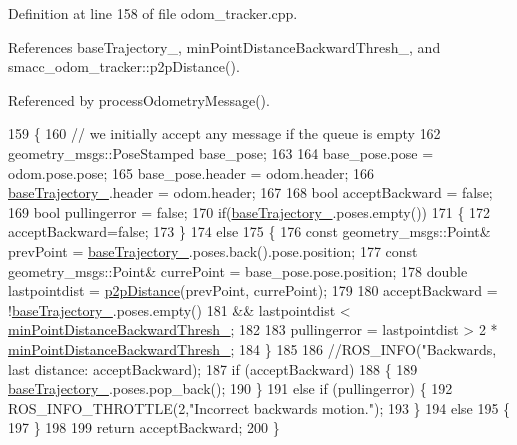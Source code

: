 Definition at line 158 of file odom\+\_\+tracker.\+cpp.



References base\+Trajectory\+\_\+, min\+Point\+Distance\+Backward\+Thresh\+\_\+, and smacc\+\_\+odom\+\_\+tracker\+::p2p\+Distance().



Referenced by process\+Odometry\+Message().


\begin{DoxyCode}
159 \{
160     \textcolor{comment}{// we initially accept any message if the queue is empty   }
162 \textcolor{comment}{}    geometry\_msgs::PoseStamped base\_pose;
163     
164     base\_pose.pose = odom.pose.pose;
165     base\_pose.header = odom.header;
166     \hyperlink{classsmacc__odom__tracker_1_1OdomTracker_ac3a17be46ab833632c5f63e75c840dc7}{baseTrajectory\_}.header = odom.header;
167 
168     \textcolor{keywordtype}{bool} acceptBackward = \textcolor{keyword}{false};
169     \textcolor{keywordtype}{bool} pullingerror = \textcolor{keyword}{false};
170     \textcolor{keywordflow}{if}(\hyperlink{classsmacc__odom__tracker_1_1OdomTracker_ac3a17be46ab833632c5f63e75c840dc7}{baseTrajectory\_}.poses.empty())
171     \{
172         acceptBackward=\textcolor{keyword}{false};
173     \}
174     \textcolor{keywordflow}{else}
175     \{
176         \textcolor{keyword}{const} geometry\_msgs::Point& prevPoint = \hyperlink{classsmacc__odom__tracker_1_1OdomTracker_ac3a17be46ab833632c5f63e75c840dc7}{baseTrajectory\_}.poses.back().pose.position;
177         \textcolor{keyword}{const} geometry\_msgs::Point& currePoint = base\_pose.pose.position;
178         \textcolor{keywordtype}{double} lastpointdist = \hyperlink{namespacesmacc__odom__tracker_a93496d9bf987249b884e9b0e60778a11}{p2pDistance}(prevPoint, currePoint);
179         
180         acceptBackward = !\hyperlink{classsmacc__odom__tracker_1_1OdomTracker_ac3a17be46ab833632c5f63e75c840dc7}{baseTrajectory\_}.poses.empty() 
181                         && lastpointdist < \hyperlink{classsmacc__odom__tracker_1_1OdomTracker_a79d94520c5da1852602aaf264377a82f}{minPointDistanceBackwardThresh\_};
182 
183         pullingerror = lastpointdist > 2 * \hyperlink{classsmacc__odom__tracker_1_1OdomTracker_a79d94520c5da1852602aaf264377a82f}{minPointDistanceBackwardThresh\_};
184     \}
185 
186     \textcolor{comment}{//ROS\_INFO("Backwards, last distance: %
       acceptBackward);}
187     \textcolor{keywordflow}{if} (acceptBackward) 
188     \{
189         \hyperlink{classsmacc__odom__tracker_1_1OdomTracker_ac3a17be46ab833632c5f63e75c840dc7}{baseTrajectory\_}.poses.pop\_back();
190     \} 
191     \textcolor{keywordflow}{else} \textcolor{keywordflow}{if} (pullingerror) \{
192         ROS\_INFO\_THROTTLE(2,\textcolor{stringliteral}{"Incorrect backwards motion."});
193     \} 
194     \textcolor{keywordflow}{else} 
195     \{
197     \}
198 
199     \textcolor{keywordflow}{return} acceptBackward;
200 \}
\end{DoxyCode}


